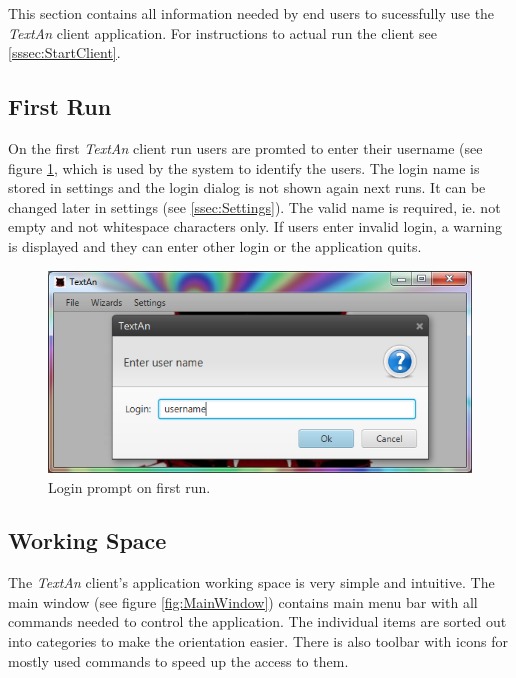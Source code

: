 \documentclass[12pt,a4paper]{report}
\newcommand{\textan}{\emph{TextAn}}
\begin{document}
This section contains all information needed by end users to sucessfully use
the \textan{} client application. For instructions to actual run the client
see \ref{sssec:StartClient}.

\subsection{First Run}

On the first \textan{} client run users are promted to enter their username
(see figure \ref{fig:Login}, which is used by the system to identify the users.
The login name is stored in settings and the login dialog is not shown again
next runs. It can be changed later in settings (see \ref{ssec:Settings}). The
valid name is required, ie. not empty and not whitespace characters only. If
users enter invalid login, a warning is displayed and they can enter other
login or the application quits.

\begin{figure}[!htb]
        \centering
        \includegraphics[width=\textwidth]{Images/login}
        \caption{Login prompt on first run.}
        \label{fig:Login}
\end{figure}

\subsection{Working Space}

The \textan{} client's application working space is very simple and intuitive.
The main window (see figure \ref{fig:MainWindow}) contains main menu bar with
all commands needed to control the application. The individual items are sorted
out into categories to make the orientation easier. There is also toolbar with
icons for mostly used commands to speed up the access to them.
\end{document}
